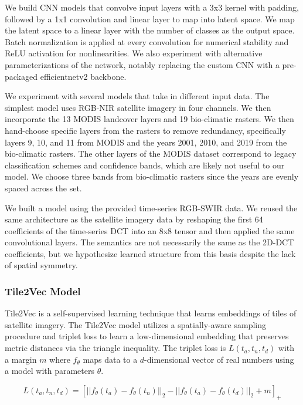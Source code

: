We build CNN models that convolve input layers with a 3x3 kernel with padding, followed by a 1x1 convolution and linear layer to map into latent space.
We map the latent space to a linear layer with the number of classes as the output space.
Batch normalization is applied at every convolution for numerical stability and ReLU activation for nonlinearities.
We also experiment with alternative parameterizations of the network, notably replacing the custom CNN with a pre-packaged efficientnetv2 backbone.

We experiment with several models that take in different input data.
The simplest model uses RGB-NIR satellite imagery in four channels.
We then incorporate the 13 MODIS landcover layers and 19 bio-climatic rasters.
We then hand-choose specific layers from the rasters to remove redundancy, specifically layers 9, 10, and 11 from MODIS and the years 2001, 2010, and 2019 from the bio-climatic rasters.
The other layers of the MODIS dataset correspond to legacy classification schemes and confidence bands, which are likely not useful to our model.
We choose three bands from bio-climatic rasters since the years are evenly spaced across the set.

We built a model using the provided time-series RGB-SWIR data.
We reused the same architecture as the satellite imagery data by reshaping the first 64 coefficients of the time-series DCT into an 8x8 tensor and then applied the same convolutional layers.
The semantics are not necessarily the same as the 2D-DCT coefficients, but we hypothesize learned structure from this basis despite the lack of spatial symmetry.

\subsubsection{Tile2Vec Model}

Tile2Vec \cite{jean2019tile2vec} is a self-supervised learning technique that learns embeddings of tiles of satellite imagery.
The Tile2Vec model utilizes a spatially-aware sampling procedure and triplet loss to learn a low-dimensional embedding that preserves metric distances via the triangle inequality.
The triplet loss is $L(t_a, t_n, t_d)$ with a margin $m$ where $f_{\theta}$ maps data to a $d$-dimensional vector of real numbers using a model with parameters $\theta$. 

\begin{equation}
    L(t_a, t_n, t_d) = \left[
        ||f_{\theta}(t_a) - f_{\theta}(t_n)||_2
        - ||f_{\theta}(t_a) - f_{\theta}(t_d)||_2
        +m
    \right]_+
\end{equation}

